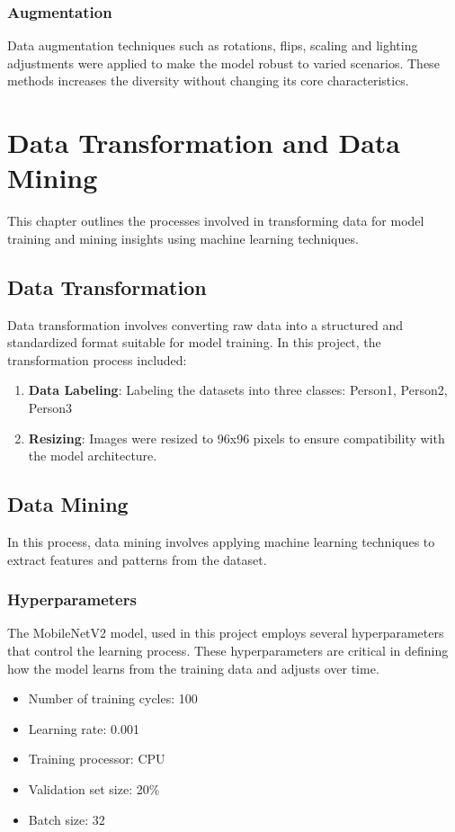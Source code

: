 \subsection{Augmentation}
Data augmentation techniques such as rotations, flips, scaling and lighting adjustments were applied to make the model robust to varied scenarios. These methods increases the diversity without changing its core characteristics.

\chapter{Data Transformation and Data Mining}
This chapter outlines the processes involved in transforming data for model training and mining insights using machine learning techniques. \cite{IEEE:1997}

\section{Data Transformation}
Data transformation involves converting raw data into a structured and standardized format suitable for model training. In this project, the transformation process included:

\begin{enumerate}
	\item \textbf{Data Labeling}: Labeling the datasets into three classes: Person1, Person2, Person3
	\item \textbf{Resizing}: Images were resized to 96x96 pixels to ensure compatibility with the model architecture.
\end{enumerate}

\section{Data Mining}
In this process, data mining involves applying machine learning techniques to extract features and patterns from the dataset.

\subsection{Hyperparameters}

The MobileNetV2 model, used in this project employs several hyperparameters that control the learning process. These hyperparameters are critical in defining how the model learns from the training data and adjusts over time.

\begin{itemize}
	\item Number of training cycles: 100
	\item Learning rate: 0.001
	\item Training processor: CPU
	\item Validation set size: 20\%
	\item Batch size: 32
\end{itemize}


